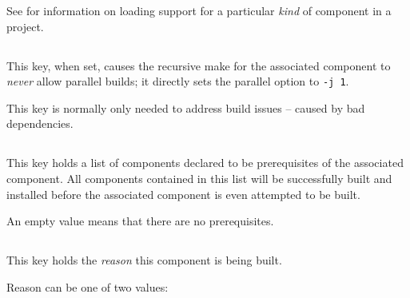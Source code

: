 See  for information on
loading support for a particular \emph{kind} of component in a
project.


\subsection{}\label{variables:no-parallel}

This key, when set, causes the recursive make for the associated
component to \emph{never} allow parallel builds; it directly sets the
\gnumake parallel option to \texttt{-j 1}.

This key is normally only needed to address build issues -- caused by
bad dependencies.


\subsection{}\label{variables:prerequisite}

This key holds a list of components declared to be prerequisites of
the associated component.  All components contained in this list will
be successfully built and installed before the associated component is
even attempted to be built.

An empty value means that there are no prerequisites.


\subsection{}\label{variables:reason}

This key holds the \emph{reason} this component is being built.

Reason can be one of two values:

